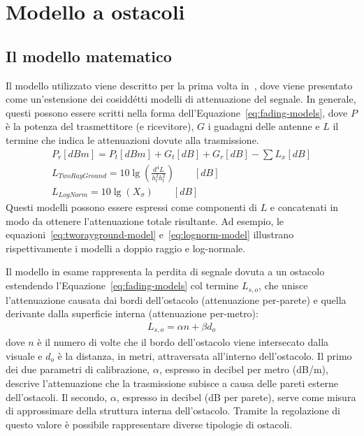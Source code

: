 
\chapter{Modello a ostacoli}\label{chap:modello-a-ostacoli}
%
\section{Il modello matematico}\label{sec:il-modello-matematico}
Il modello utilizzato viene descritto per la prima volta in~\cite{5720204}, dove viene presentato
come un'estensione dei cosiddétti modelli di attenuazione del segnale.
In generale, questi possono essere scritti nella forma dell'Equazione~\ref{eq:fading-models}, dove $P$ è la potenza del trasmettitore (e ricevitore),
$G$ i guadagni delle antenne e $L$ il termine che indica le attenuazioni dovute alla trasmissione.
%
\begin{gather}
	P_r[dBm] = P_t[dBm] + G_t[dB] + G_r[dB] - \sum L_x[dB] 														\label{eq:fading-models} \\
	L_{TwoRayGround} = 10 \lg \left( \frac{d^4 L}{h^2_t h^2_t} \right)	\qquad [dB]		\label{eq:tworayground-model} \\
	L_{LogNorm} = 10 \lg \left( X_\sigma \right)	\qquad [dB]													\label{eq:lognorm-model}
\end{gather}
%
Questi modelli possono essere espressi come componenti di $L$ e concatenati in modo da ottenere l'attenuazione totale risultante.
Ad esempio, le equazioni~\ref{eq:tworayground-model} e~\ref{eq:lognorm-model} illustrano rispettivamente i modelli a doppio raggio e log-normale.

Il modello in esame rappresenta la perdita di segnale dovuta a un ostacolo estendendo l'Equazione~\ref{eq:fading-models}
col termine $L_{s,o}$, che unisce l'attenuazione causata dai bordi dell'ostacolo (attenuazione per-parete)
e quella derivante dalla superficie interna (attenuazione per-metro):
%
\begin{gather}\label{eq:osbtacle-model}
	L_{s,o} = \alpha n + \beta d_o
\end{gather}
dove $n$ è il numero di volte che il bordo dell'ostacolo viene intersecato dalla visuale e $d_o$ è la distanza, in metri, attraversata all'interno dell'ostacolo.
Il primo dei due parametri di calibrazione, $\alpha$, espresso in decibel per metro (dB/m), descrive l'attenuazione
che la trasmissione subisce a causa delle pareti esterne dell'ostacoli.
Il secondo, $\alpha$, espresso in decibel (dB per parete), serve come misura di approssimare della struttura interna dell'ostacolo.
Tramite la regolazione di questo valore è possibile rappresentare diverse tipologie di ostacoli.

